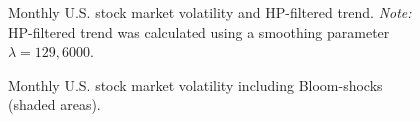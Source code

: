 \documentclass[a4paper,12pt,oneside,pointednumbers,numbers=noenddot,bibtotoc,bigheadings,liststotoc,chapterprefix=true]{scrbook}
\begin{document}
\begin{figure}[hbt]
   \centering
   \setlength\fboxsep{0pt}
   \setlength\fboxrule{0pt}
      \caption[Monthly U.S. stock market volatility and HP-filtered trend.]{Monthly U.S. stock market volatility and HP-filtered trend.
      \textit{Note:} HP-filtered trend was calculated using a smoothing parameter $\lambda = 129,6000$.}   \label{fig:volatility_cycle_shocks}
\end{figure}

\begin{figure}[hbt]
   \centering
   \setlength\fboxsep{0pt}
   \setlength\fboxrule{0pt}
      \caption[Monthly U.S. stock market volatility including Bloom-shocks (shaded areas).]{Monthly U.S. stock market volatility including Bloom-shocks (shaded areas).}   \label{fig:volatility_cycle_shocks2}
\end{figure}
\end{document}
